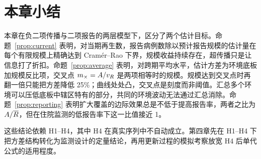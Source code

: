 \section{本章小结}
\label{sec:model-summary}

本章在负二项传播与二项报告的两层模型下，区分了两个估计目标。命题~\ref{prop:current} 表明，对当期再生数，报告病例数除以预计报告规模的估计量在每个有限规模上精确达到 Cramér--Rao 下界，规模收益持续存在，超传播只是让信息打了折扣。命题~\ref{prop:average} 表明，对跨期平均水平，估计方差为环境底板加规模反比项，交叉点 $m_{\times}=A/v_R$ 是两项相等时的规模。规模达到交叉点时再翻一倍只能把方差降低 25\%；曲线处处凸，交叉点是刻度而非阈值。汇总多个环境可以压低底板中辖区特有的部分，共同的环境波动无法通过汇总消除。命题~\ref{prop:reporting} 表明扩大覆盖的边际效果总是不低于提高报告率，两者之比为 $A/\overline{R}$，但在住院监测的低报告率下这一比值接近 1。

这些结论依赖 H1--H4，其中 H4 在真实序列中不自动成立。第四章先在 H1--H4 下把方差结构转化为监测设计的定量结论，再用更新过程的模拟考察放宽 H4 后单代公式的适用程度。
